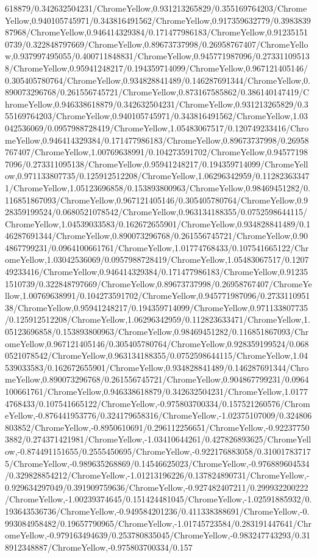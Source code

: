 {\begin{tikzternal}
{618879/0.342632504231/ChromeYellow,0.931213265829/0.355169764203/ChromeYellow,0.940105745971/0.343816491562/ChromeYellow,0.917359632779/0.398383987968/ChromeYellow,0.946414329384/0.171477986183/ChromeYellow,0.912351510739/0.322848797669/ChromeYellow,0.89673737998/0.26958767407/ChromeYellow,0.937997495055/0.400711848831/ChromeYellow,0.945771987096/0.273311095138/ChromeYellow,0.95941248217/0.194359714099/ChromeYellow,0.967121405146/0.305405780764/ChromeYellow,0.934828841489/0.146287691344/ChromeYellow,0.890073296768/0.261556745721/ChromeYellow,0.873167585862/0.386140147419/ChromeYellow,0.946338618879/0.342632504231/ChromeYellow,0.931213265829/0.355169764203/ChromeYellow,0.940105745971/0.343816491562/ChromeYellow,1.03042536069/0.0957988728419/ChromeYellow,1.05483067517/0.120749233416/ChromeYellow,0.946414329384/0.171477986183/ChromeYellow,0.89673737998/0.26958767407/ChromeYellow,1.00769638991/0.104273591702/ChromeYellow,0.945771987096/0.273311095138/ChromeYellow,0.95941248217/0.194359714099/ChromeYellow,0.971133807735/0.125912512208/ChromeYellow,1.06296342959/0.112823633471/ChromeYellow,1.05123696858/0.153893800963/ChromeYellow,0.98469451282/0.116851867093/ChromeYellow,0.967121405146/0.305405780764/ChromeYellow,0.928359199524/0.0680521078542/ChromeYellow,0.963134188355/0.0752598644115/ChromeYellow,1.04539033583/0.162672655901/ChromeYellow,0.934828841489/0.146287691344/ChromeYellow,0.890073296768/0.261556745721/ChromeYellow,0.904867799231/0.0964100661761/ChromeYellow,1.01774768433/0.107541665122/ChromeYellow,1.03042536069/0.0957988728419/ChromeYellow,1.05483067517/0.120749233416/ChromeYellow,0.946414329384/0.171477986183/ChromeYellow,0.912351510739/0.322848797669/ChromeYellow,0.89673737998/0.26958767407/ChromeYellow,1.00769638991/0.104273591702/ChromeYellow,0.945771987096/0.273311095138/ChromeYellow,0.95941248217/0.194359714099/ChromeYellow,0.971133807735/0.125912512208/ChromeYellow,1.06296342959/0.112823633471/ChromeYellow,1.05123696858/0.153893800963/ChromeYellow,0.98469451282/0.116851867093/ChromeYellow,0.967121405146/0.305405780764/ChromeYellow,0.928359199524/0.0680521078542/ChromeYellow,0.963134188355/0.0752598644115/ChromeYellow,1.04539033583/0.162672655901/ChromeYellow,0.934828841489/0.146287691344/ChromeYellow,0.890073296768/0.261556745721/ChromeYellow,0.904867799231/0.0964100661761/ChromeYellow,0.946338618879/0.342632504231/ChromeYellow,1.01774768433/0.107541665122/ChromeYellow,-0.975803700334/0.157521260576/ChromeYellow,-0.876441953776/0.324179658316/ChromeYellow,-1.02375107009/0.324806803852/ChromeYellow,-0.8950610691/0.296112256651/ChromeYellow,-0.922377503882/0.274371421981/ChromeYellow,-1.03410644261/0.427826893625/ChromeYellow,-0.874491151655/0.2555450695/ChromeYellow,-0.922176883058/0.310017837175/ChromeYellow,-0.989635268869/0.14546625023/ChromeYellow,-0.976889604534/0.329828854212/ChromeYellow,-1.01213196226/0.137824890731/ChromeYellow,-0.929634297049/0.391909759636/ChromeYellow,-0.927482407211/0.299932200222/ChromeYellow,-1.00239374645/0.151424481045/ChromeYellow,-1.02591885932/0.193643536736/ChromeYellow,-0.949584201236/0.411338388691/ChromeYellow,-0.993084958482/0.19657790965/ChromeYellow,-1.01745723584/0.283191447641/ChromeYellow,-0.979163494639/0.253780835045/ChromeYellow,-0.983247743293/0.318912348887/ChromeYellow,-0.975803700334/0.157}
\end{tikzternal}}
